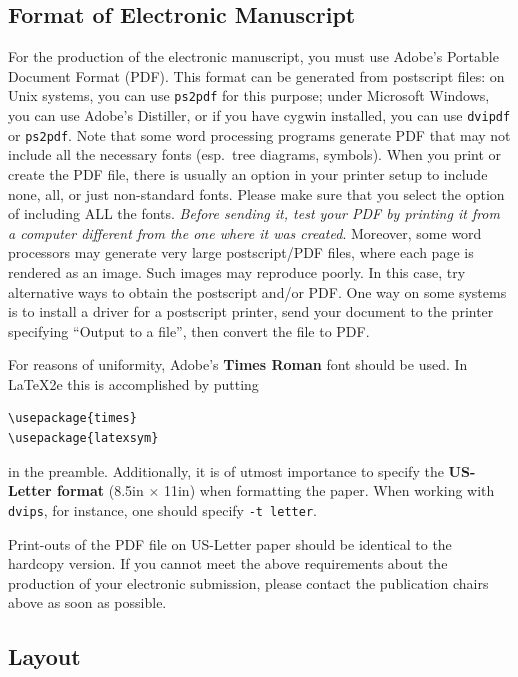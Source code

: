 \documentclass[11pt,letterpaper]{article}
\begin{document}
\subsection{Format of Electronic Manuscript}
\label{sect:pdf}

For the production of the electronic manuscript, you must use Adobe's
Portable Document Format (PDF). This format can be generated from
postscript files: on Unix systems, you can use {\small\tt ps2pdf} for this
purpose; under Microsoft Windows, you can use Adobe's Distiller, or
if you have cygwin installed, you can use {\small\tt dvipdf} or
{\small\tt ps2pdf}.  Note 
that some word processing programs generate PDF that may not include
all the necessary fonts (esp.\ tree diagrams, symbols). When you print
or create the PDF file, there is usually an option in your printer
setup to include none, all, or just non-standard fonts.  Please make
sure that you select the option of including ALL the fonts.  {\em Before
sending it, test your {\/\em PDF} by printing it from a computer different
from the one where it was created}. Moreover, some word processors may
generate very large postscript/PDF files, where each page is rendered as
an image. Such images may reproduce poorly.  In this case, try alternative
ways to obtain the postscript and/or PDF.  One way on some systems is to
install a driver for a postscript printer, send your document to the
printer specifying ``Output to a file'', then convert the file to PDF.

For reasons of uniformity, Adobe's {\bf Times Roman} font should be
used. In \LaTeX2e{} this is accomplished by putting
\small
\begin{verbatim}
\usepackage{times}
\usepackage{latexsym}
\end{verbatim}
\normalsize
in the preamble.
Additionally, it is of utmost importance to specify the {\bf US-Letter
format} (8.5in $\times$ 11in) when formatting the paper. When working with
{\small\tt dvips}, for instance, one should specify {\small\tt -t letter}.

Print-outs of the PDF file on US-Letter paper should be identical to the
hardcopy version.  If you cannot meet the above requirements about the
production of your electronic submission, please contact the
publication chairs above  as soon as possible.

\subsection{Layout}
\label{ssec:layout}
\end{document}
